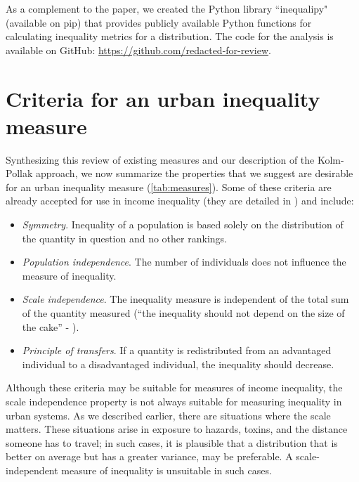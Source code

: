 \documentclass[final,3p,times,onecolumn,sort&compress]{elsarticle}
\begin{document}
As a complement to the paper, we created the Python library ``inequalipy" (available on pip) that provides publicly available Python functions for calculating inequality metrics for a distribution. The code for the analysis is available on GitHub: \url{https://github.com/redacted-for-review}.


\section{Criteria for an urban inequality measure}
\label{sec:criteria}

Synthesizing this review of existing measures and our description of the Kolm-Pollak approach, we now summarize the properties that we suggest are desirable for an urban inequality measure (\autoref{tab:measures}).
Some of these criteria are already accepted for use in income inequality
(they are detailed in \cite{Adger1997-tu, Blackwood1994-ie, Fields1978-tb}) and include:

\begin{itemize}
    \item \textit{Symmetry}. Inequality of a population is based solely on the distribution of the quantity in question and no other rankings.
    \item \textit{Population independence}. The number of individuals does not influence the measure of inequality.
    \item \textit{Scale independence}. The inequality measure is independent of the total sum of the quantity measured (``the inequality should not depend on the size of the cake'' - \cite{Adger1997-tu}).
    \item \textit{Principle of transfers}. If a quantity is redistributed from an advantaged individual to a disadvantaged individual, the inequality should decrease.
\end{itemize}

Although these criteria may be suitable for measures of income inequality, the scale independence property is not always suitable for measuring inequality in urban systems.
As we described earlier, there are situations where the scale matters. 
These situations arise in exposure to hazards, toxins, and the distance someone has to travel; in such cases, it is plausible that a distribution that is better on average but has a greater variance, may be preferable.
A scale-independent measure of inequality is unsuitable in such cases.
\end{document}
